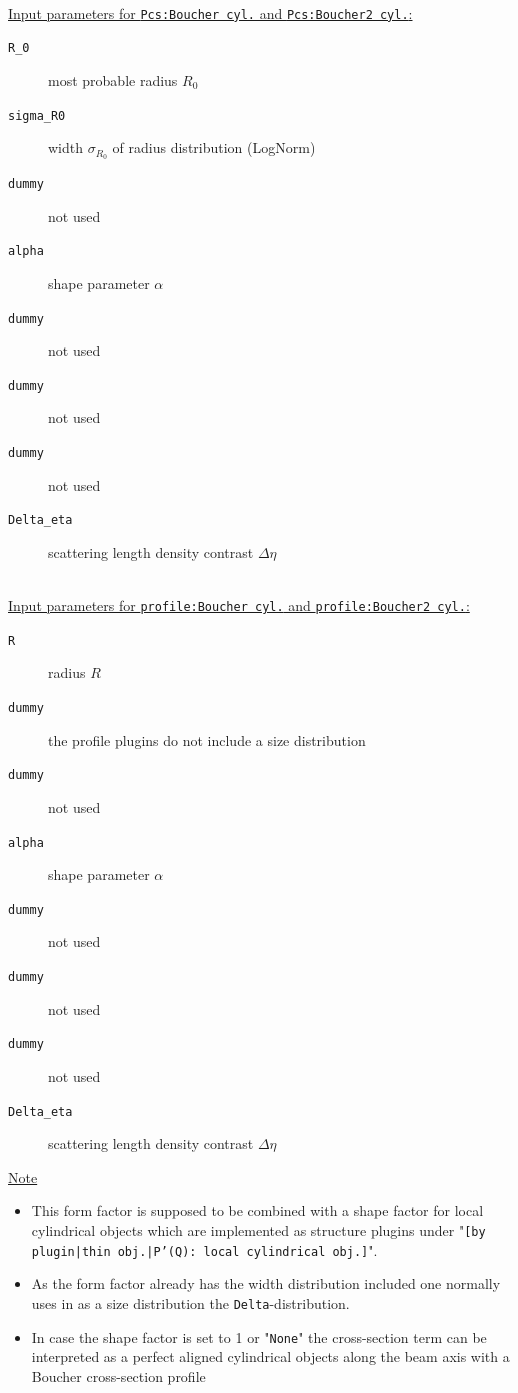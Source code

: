 \vspace{1mm}

\hspace{1pt}\\
\uline{Input parameters for \texttt{Pcs:Boucher cyl.} and \texttt{Pcs:Boucher2 cyl.}:}
\begin{description}
    \item[\texttt{R\_0}] most probable radius $R_0$
    \item[\texttt{sigma\_R0}] width $\sigma_{R_0}$ of radius distribution (LogNorm)
    \item[\texttt{dummy}] not used
    \item[\texttt{alpha}] shape parameter $\alpha$
    \item[\texttt{dummy}] not used
    \item[\texttt{dummy}] not used
    \item[\texttt{dummy}] not used
    \item[\texttt{Delta\_eta}] scattering length density contrast $\Delta \eta$
\end{description}

\hspace{1pt}\\
\uline{Input parameters for \texttt{profile:Boucher cyl.} and \texttt{profile:Boucher2 cyl.}:}
\begin{description}
    \item[\texttt{R}] radius $R$
    \item[\texttt{dummy}] the profile plugins do not include a size distribution
    \item[\texttt{dummy}] not used
    \item[\texttt{alpha}] shape parameter $\alpha$
    \item[\texttt{dummy}] not used
    \item[\texttt{dummy}] not used
    \item[\texttt{dummy}] not used
    \item[\texttt{Delta\_eta}] scattering length density contrast $\Delta \eta$
\end{description}
\noindent
\uline{Note}
\begin{itemize}
  \item This form factor is supposed to be combined with a shape factor for
local cylindrical objects which are implemented as structure  plugins
under "\texttt{[by plugin|thin obj.|P'(Q): local cylindrical obj.]}".
\item As the form factor already has the width distribution included one normally uses in \SASfit as a size distribution
the \texttt{Delta}-distribution.
\item In case the shape factor is set to 1 or "\texttt{None}" the cross-section term can be interpreted as a perfect aligned cylindrical objects along the beam axis with a Boucher cross-section profile
\end{itemize}


